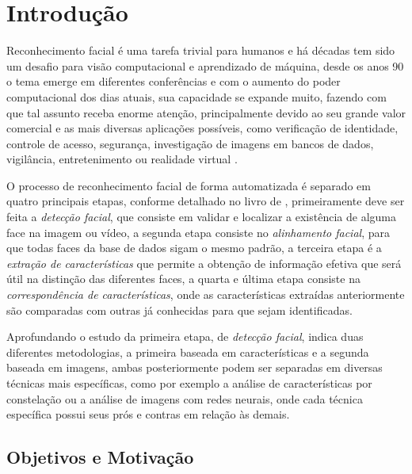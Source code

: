 
\chapter[Introdução]{Introdução}

Reconhecimento facial é uma tarefa trivial para humanos e há décadas tem sido um desafio para visão computacional e aprendizado de máquina, desde os anos 90 o tema emerge em diferentes conferências e com o aumento do poder computacional dos dias atuais, sua capacidade se expande muito, fazendo com que tal assunto receba enorme atenção, principalmente devido ao seu grande valor comercial e as mais diversas aplicações possíveis, como verificação de identidade, controle de acesso, segurança, investigação de imagens em bancos de dados, vigilância, entretenimento ou realidade virtual \cite{appli2014} \cite{Zhao:2003:FRL:954339.954342}.

O processo de reconhecimento facial de forma automatizada é separado em quatro principais etapas, conforme detalhado no livro de , primeiramente deve ser feita a \textit{detecção facial}, que consiste em validar e localizar a existência de alguma face na imagem ou vídeo, a segunda etapa consiste no \textit{alinhamento facial}, para que todas faces da base de dados sigam o mesmo padrão, a terceira etapa é a \textit{extração de características} que permite a obtenção de informação efetiva que será útil na distinção das diferentes faces, a quarta e última etapa consiste na \textit{correspondência de características}, onde as características extraídas anteriormente são comparadas com outras já conhecidas para que sejam identificadas.

Aprofundando o estudo da primeira etapa, de \textit{detecção facial},  indica duas diferentes metodologias, a primeira baseada em características e a segunda baseada em imagens, ambas posteriormente podem ser separadas em diversas técnicas mais específicas, como por exemplo a análise de características por constelação ou a análise de imagens com redes neurais, onde cada técnica específica possui seus prós e contras em relação às demais.

\section{Objetivos e Motivação}

